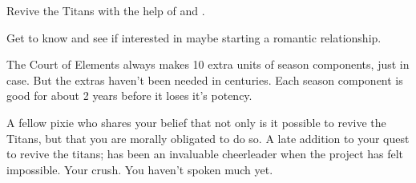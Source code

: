 \documentclass[char]{PP}
\begin{document}
\begin{itemz}
	\item Revive the Titans with the help of \cFTitan{} and \cEAirship{}.
	\item Get to know \cMAirship{} and see if \cMAirship{\theyare} interested in maybe starting a romantic relationship.
\end{itemz}

\begin{itemz}[Notes]
	\item The Court of Elements always makes 10 extra units of season components, just in case. But the extras haven't been needed in centuries. Each season component is good for about 2 years before it loses it's potency.
\end{itemz}

\begin{contacts}
	\contact{\cFTitan{}} A fellow pixie who shares your belief that not only is it possible to revive the Titans, but that you are morally obligated to do so.
	\contact{\cEAirship{}} A late addition to your quest to revive the titans; \cEAirship{} has been an invaluable cheerleader when the project has felt impossible.
	\contact{\cMAirship{}} Your crush. You haven’t spoken much yet.
\end{contacts}
\end{document}
